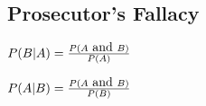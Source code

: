 	\subsection{ Prosecutor's Fallacy}
			
			
			
			$P(B|A) = { P(A \mbox{ and } B) \over P(A) } $
			
			$P(A|B) = { P( A \mbox{ and }B) \over P(B) } $
			
			
			